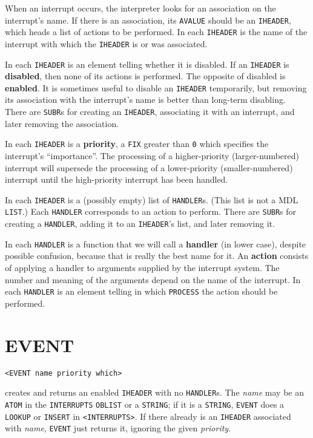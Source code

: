 \documentclass[a4paper]{scrbook}
\begin{document}
When an interrupt occurs, the interpreter looks for an association on the interrupt's name. If there is an association, its
\texttt{AVALUE} should be an \texttt{IHEADER}, which heads a list of actions to be performed. In
each \texttt{IHEADER} is the name of the interrupt with which the \texttt{IHEADER} is or was associated.

In each \texttt{IHEADER} is an element telling whether it is disabled. If an \texttt{IHEADER} is \textbf{disabled}, then
none of its actions is performed. The opposite of disabled is \textbf{enabled}. It is sometimes useful to disable an
\texttt{IHEADER} temporarily, but removing its association with the interrupt's name is better than long-term disabling.
There are \texttt{SUBR}s for creating an \texttt{IHEADER}, associating it with an interrupt, and later removing the
association.

In each \texttt{IHEADER} is a \textbf{priority}, a \texttt{FIX} greater than \texttt{0} which specifies the interrupt's
``importance''. The processing of a higher-priority (larger-numbered) interrupt will supersede the processing of a
lower-priority (smaller-numbered) interrupt until the high-priority interrupt has been handled.

In each \texttt{IHEADER} is a (possibly empty) list of \texttt{HANDLER}s. (This list is not a MDL
\texttt{LIST}.) Each \texttt{HANDLER} corresponds to an action to perform. There are \texttt{SUBR}s for creating a
\texttt{HANDLER}, adding it to an \texttt{IHEADER}'s list, and later removing it.

In each \texttt{HANDLER} is a function that we will call a \textbf{handler} (in lower case), despite possible confusion,
because that is really the best name for it. An \textbf{action} consists of applying a handler to arguments supplied by the
interrupt system. The number and meaning of the arguments depend on the name of the interrupt. In each \texttt{HANDLER} is
an element telling in which \texttt{PROCESS} the action should be performed.

\section{EVENT}\label{event}

\begin{verbatim}
<EVENT name priority which>
\end{verbatim}

 creates and returns an enabled \texttt{IHEADER} with no \texttt{HANDLER}s. The \emph{name}
may be an \texttt{ATOM} in the \texttt{INTERRUPTS} \texttt{OBLIST} or a \texttt{STRING}; if it is a \texttt{STRING},
\texttt{EVENT} does a \texttt{LOOKUP} or \texttt{INSERT} in \texttt{\textless{}INTERRUPTS\textgreater{}}. If there already
is an \texttt{IHEADER} associated with \emph{name}, \texttt{EVENT} just returns it, ignoring the given \emph{priority}.
\end{document}
